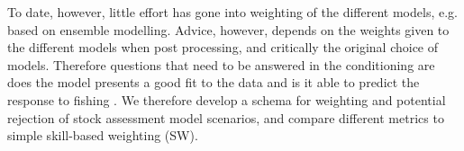  To date, however, little effort has gone into weighting of the different models, e.g. based on ensemble modelling. Advice, however, depends on the weights given to the different models when post processing, and critically the original choice of models. Therefore questions that need to be answered in the conditioning are does the model presents a good fit to the data and is it able to predict the response to fishing \citep{carvalho2020cookbook}. We therefore develop a schema for weighting and potential rejection of stock assessment model scenarios, and compare different metrics to simple skill-based weighting (SW).
 
